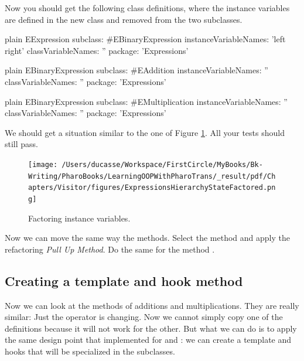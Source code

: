 \documentclass[10pt,twoside,english]{_support/latex/sbabook/sbabook}
\begin{document}
Now you should get the following class definitions, where the instance variables are defined in the new class and removed from the two subclasses. 

\begin{displaycode}{plain}
EExpression subclass: #EBinaryExpression
	instanceVariableNames: 'left right'
	classVariableNames: ''
	package: 'Expressions'
\end{displaycode}

\begin{displaycode}{plain}
EBinaryExpression subclass: #EAddition
	instanceVariableNames: ''
	classVariableNames: ''
	package: 'Expressions'
\end{displaycode}

\begin{displaycode}{plain}
EBinaryExpression subclass: #EMultiplication
	instanceVariableNames: ''
	classVariableNames: ''
	package: 'Expressions'
\end{displaycode}

We should get a situation similar to the one of Figure \ref{figExpressionFactoredState}. All your tests should still pass. 


\begin{figure}

\begin{center}
\texttt{[image: /Users/ducasse/Workspace/FirstCircle/MyBooks/Bk-Writing/PharoBooks/LearningOOPWithPharoTrans/\_result/pdf/Chapters/Visitor/figures/ExpressionsHierarchyStateFactored.png]}\caption{Factoring instance variables.\label{figExpressionFactoredState}}\end{center}
\end{figure}


Now we can move the same way the methods. Select the method  and apply the refactoring \textit{Pull Up Method}.  Do the same for the method . 
\subsection{Creating a template and hook method}
Now we can look at the methods  of additions and multiplications. They are really similar: Just the operator is changing. Now we cannot simply copy one of the definitions because it will not work for the other. But what we can do is to apply the same design point that implemented for  and : we can create a template and hooks that will be specialized in the subclasses. 
\end{document}
